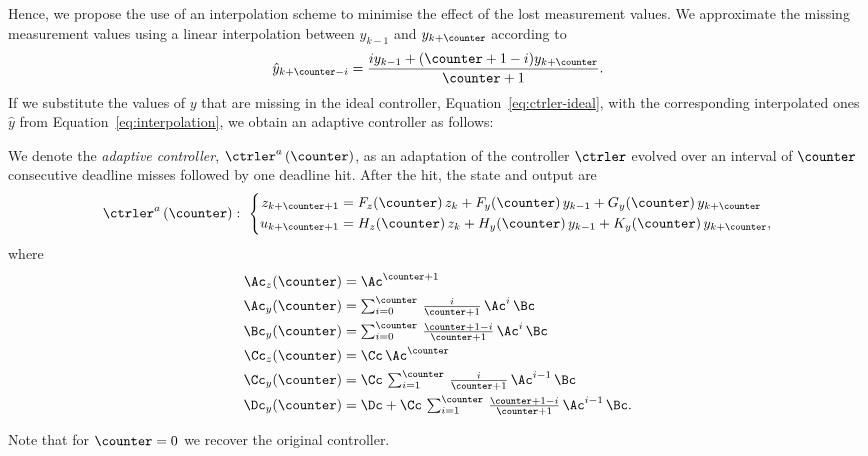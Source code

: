Hence, we propose the use of an interpolation scheme to minimise the effect of the lost measurement values.
We approximate the missing measurement values using a linear interpolation between $y_{k-1}$ and $y_{k+\counter}$ according to
%
\begin{equation}
    \label{eq:interpolation}
    \hat y_{k+\counter-i} = \frac{i y_{k-1} + (\counter+1-i) y_{k+\counter}}{\counter+1} .
\end{equation}
%
If we substitute the values of $y$ that are missing in the ideal controller, Equation~\eqref{eq:ctrler-ideal}, with the corresponding interpolated ones $\hat y$ from Equation~\eqref{eq:interpolation}, we obtain an adaptive controller as follows:

\begin{definition}%
    We denote the \emph{adaptive controller}, $\ctrler^a\funof{\counter}$, as an adaptation of the controller $\ctrler$ evolved over an interval of $\counter$ consecutive deadline misses followed by one deadline hit.
    After the hit, the state and output are
    \begin{equation}
        \label{eq:adaptive}
           \ctrler^a\funof{\counter}: \,\,
            \left\{
            \begin{aligned}
                z_{k+\counter+1} &= F_z(\counter)\,z_{k} +  F_y(\counter)\,y_{k-1} + G_y(\counter)\,y_{k+\counter} \\
                u_{k+\counter+1} &= H_z(\counter)\,z_{k} + H_y(\counter)\,y_{k-1} + K_y(\counter)\,y_{k+\counter},
            \end{aligned}\right.
    \end{equation}
    where
    \begin{equation*}
        \begin{aligned}
         \Ac_z(\counter) &= \Ac^{\counter+1} \\
         \Ac_y(\counter) &= \textstyle\sum\nolimits_{i=0}^{\counter}\, \tfrac{i}{\counter+1}\, \Ac^{i}\, \Bc \\
         \Bc_y(\counter) &= \textstyle\sum\nolimits_{i=0}^{\counter}\, \tfrac{\counter+1-i}{\counter+1}\, \Ac^{i}\, \Bc \\
         \Cc_z(\counter) &= \Cc\, \Ac^\counter \\
         \Cc_y(\counter) &= \Cc\, \textstyle\sum\nolimits_{i=1}^{\counter}\, \tfrac{i}{\counter+1}\, \Ac^{i-1}\, \Bc \\
         \Dc_y(\counter) &= \Dc + \Cc\, \textstyle\sum\nolimits_{i=1}^{\counter}\, \tfrac{\counter+1-i}{\counter+1}\, \Ac^{i-1}\, \Bc.
         \end{aligned}
    \end{equation*}
\end{definition}
Note that for $\counter = 0$ we recover the original controller.

